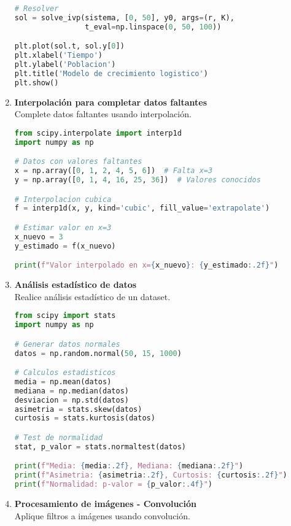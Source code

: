 \documentclass[12pt,a4paper]{article}
\begin{document}
\begin{enumerate}[label=\textbf{Ejercicio \arabic*:}, leftmargin=1.5cm]
\begin{lstlisting}[language=Python]
# Resolver
sol = solve_ivp(sistema, [0, 50], y0, args=(r, K), 
                t_eval=np.linspace(0, 50, 100))

plt.plot(sol.t, sol.y[0])
plt.xlabel('Tiempo')
plt.ylabel('Poblacion')
plt.title('Modelo de crecimiento logistico')
plt.show()
\end{lstlisting}

\item \textbf{Interpolación para completar datos faltantes} \\
Complete datos faltantes usando interpolación.

\begin{lstlisting}[language=Python]
from scipy.interpolate import interp1d
import numpy as np

# Datos con valores faltantes
x = np.array([0, 1, 2, 4, 5, 6])  # Falta x=3
y = np.array([0, 1, 4, 16, 25, 36])  # Valores conocidos

# Interpolacion cubica
f = interp1d(x, y, kind='cubic', fill_value='extrapolate')

# Estimar valor en x=3
x_nuevo = 3
y_estimado = f(x_nuevo)

print(f"Valor interpolado en x={x_nuevo}: {y_estimado:.2f}")
\end{lstlisting}

\item \textbf{Análisis estadístico de datos} \\
Realice análisis estadístico de un dataset.

\begin{lstlisting}[language=Python]
from scipy import stats
import numpy as np

# Generar datos normales
datos = np.random.normal(50, 15, 1000)

# Calculos estadisticos
media = np.mean(datos)
mediana = np.median(datos)
desviacion = np.std(datos)
asimetria = stats.skew(datos)
curtosis = stats.kurtosis(datos)

# Test de normalidad
stat, p_valor = stats.normaltest(datos)

print(f"Media: {media:.2f}, Mediana: {mediana:.2f}")
print(f"Asimetria: {asimetria:.2f}, Curtosis: {curtosis:.2f}")
print(f"Normalidad: p-valor = {p_valor:.4f}")
\end{lstlisting}

\item \textbf{Procesamiento de imágenes - Convolución} \\
Aplique filtros a imágenes usando convolución.


\end{enumerate}
\end{document}
